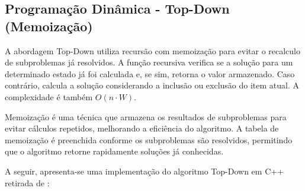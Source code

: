 \subsection{Programação Dinâmica - Top-Down (Memoização)}
A abordagem Top-Down utiliza recursão com memoização para evitar o recalculo de subproblemas já resolvidos.
A função recursiva verifica se a solução para um determinado estado já foi calculada e, se sim, retorna o valor armazenado.
Caso contrário, calcula a solução considerando a inclusão ou exclusão do item atual. A complexidade é também \(O(n \cdot W)\).

Memoização é uma técnica que armazena os resultados de subproblemas para evitar cálculos repetidos, melhorando a eficiência do algoritmo.
A tabela de memoização é preenchida conforme os subproblemas são resolvidos, permitindo que o algoritmo retorne rapidamente soluções já conhecidas.

A seguir, apresenta-se uma implementação do algoritmo Top-Down em C++ retirada de \cite{geeksForGeeks-knapsack}:

